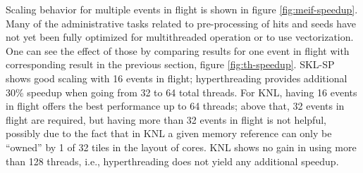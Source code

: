 \documentclass{webofc}
\begin{document}
Scaling behavior for multiple events in flight is shown in figure
\ref{fig:meif-speedup}. Many of the administrative tasks related to
pre-processing of hits and seeds have not yet been fully optimized for
multithreaded operation or to use vectorization. One can see the effect of
those by comparing results for one event in flight with corresponding result in
the previous section, figure \ref{fig:th-speedup}. SKL-SP shows good scaling with 16
events in flight; hyperthreading provides additional 30\% speedup when going from 32 to 64
total threads. For KNL, having 16 events in flight offers the best performance up to
64 threads; above that, 32 events in flight are required, but having more than
32 events in flight is not helpful, possibly due to the fact that in KNL a given
memory reference can only be ``owned'' by 1 of 32 tiles in the layout of cores.
KNL shows no gain in using more than 128 threads, i.e., hyperthreading does not
yield any additional speedup.
\end{document}
